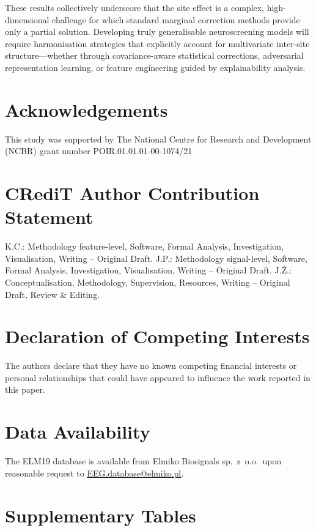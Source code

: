 \documentclass[preprint,12pt]{elsarticle}
\begin{document}
These results collectively underscore that the site effect is a
complex, high-dimensional challenge for which standard marginal
correction methods provide only a partial solution.
Developing truly generalisable neuroscreening models will require
harmonisation strategies that explicitly account for multivariate
inter-site structure---whether through covariance-aware statistical
corrections, adversarial representation learning, or feature
engineering guided by explainability analysis.

\section*{Acknowledgements}
This study was supported by The National Centre for Research and
Development (NCBR) grant number POIR.01.01.01-00-1074/21

\section*{CRediT Author Contribution Statement}
K.C.: Methodology feature-level, Software, Formal Analysis, Investigation,
Visualisation, Writing -- Original Draft.
J.P.: Methodology signal-level, Software, Formal Analysis, Investigation,
Visualisation, Writing -- Original Draft.
J.\.Z.: Conceptualisation, Methodology,  Supervision, Resources, Writing -- Original Draft, Review \& Editing.

\section*{Declaration of Competing Interests}
The authors declare that they have no known competing financial
interests or personal relationships that could have appeared to
influence the work reported in this paper.

\section*{Data Availability}
The ELM19 database is available from Elmiko Biosignals sp.~z~o.o.\
upon reasonable request to
\href{mailto:EEG.database@elmiko.pl}{EEG.database@elmiko.pl}.

\appendix
\section{Supplementary Tables}
\label{app:tables}
\end{document}
